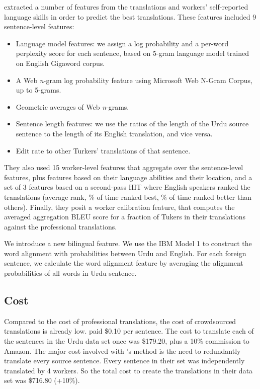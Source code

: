 \documentclass[11pt]{article}
\begin{document}
 extracted a number of features from the translations and workers' self-reported language skills in order to predict the best translations.   These features included 9 sentence-level features:
\begin{itemize}
\item Language model features:	we assign a log probability and a per-word perplexity score for each sentence, based on 5-gram language model trained on English Gigaword corpus.
\item A Web \textit{n}-gram log probability feature using Microsoft Web N-Gram Corpus, up to 5-grams.
\item Geometric averages of Web \textit{n}-grams.
\item Sentence length features:	we use the ratios of the length of the Urdu source sentence to the length of its English translation, and vice versa.
\item Edit rate to other Turkers' translations of that sentence.
\end{itemize}
They also used 15 worker-level features that aggregate over the sentence-level features, plus features based on their language abilities and their location, and a set of 3 features based on a second-pass HIT where English speakers ranked the translations (average rank, \% of time ranked best, \% of time ranked better than others).   Finally, they posit a worker calibration feature, that computes the averaged aggregation BLEU score for a fraction of Tukers in their translations against the professional translations. 


We introduce a new bilingual feature. We use the IBM Model 1 to construct the word alignment with probabilities between Urdu and English. For each foreign sentence, we calculate the word alignment feature by averaging the alignment probabilities of all words in Urdu sentence. 



\subsection{Cost}

Compared to the cost of professional translations, the cost of crowdsourced translations is already low.  paid \$0.10 per sentence.  The cost to translate each of the sentences in the Urdu data set once was \$179.20, plus a 10\% commission to Amazon.  The major cost involved with   's method is the need to redundantly translate every source sentence.   Every sentence in their set was independently translated by 4 workers.  So the total cost to create the translations in their data set was \$716.80 (+10\%).
\end{document}
